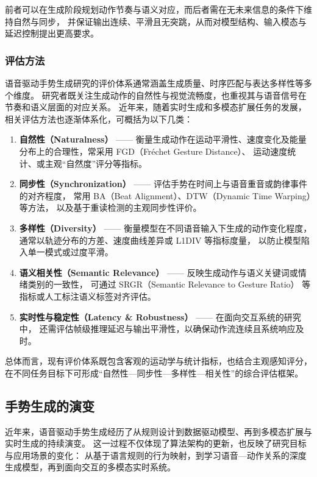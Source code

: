 前者可以在生成阶段规划动作节奏与语义对应，而后者需在无未来信息的条件下维持自然与同步，
并保证输出连续、平滑且无突跳，从而对模型结构、输入模态与延迟控制提出更高要求。

\subsubsection{评估方法}

语音驱动手势生成研究的评价体系通常涵盖生成质量、时序匹配与表达多样性等多个维度。
研究者既关注生成动作的自然性与视觉流畅度，也重视其与语音信号在节奏和语义层面的对应关系。
近年来，随着实时生成和多模态扩展任务的发展，相关评估方法也逐渐体系化，可概括为以下几类：

\begin{enumerate}
    \item \textbf{自然性（Naturalness）} —— 衡量生成动作在运动平滑性、速度变化及能量分布上的合理性，常采用 FGD（Fréchet Gesture Distance）\cite{ginosar2019speech2gesture}、
          运动速度统计、或主观“自然度”评分等指标。
    \item \textbf{同步性（Synchronization）} —— 评估手势在时间上与语音重音或韵律事件的对齐程度，
          常用 BA（Beat Alignment）\cite{kucherenko2021predictability}、DTW（Dynamic Time Warping）等方法，
          以及基于重读检测的主观同步性评价。
    \item \textbf{多样性（Diversity）} —— 衡量模型在不同语音输入下生成的动作变化程度，
          通常以轨迹分布的方差、速度曲线差异或 L1DIV 等指标度量，
          以防止模型陷入单一模式或过度平滑。
    \item \textbf{语义相关性（Semantic Relevance）} —— 反映生成动作与语义关键词或情绪类别的一致性，
          可通过 SRGR（Semantic Relevance to Gesture Ratio）\cite{beatcamn} 等指标或人工标注语义标签对齐评估。
    \item \textbf{实时性与稳定性（Latency \& Robustness）} —— 在面向交互系统的研究中，
          还需评估帧级推理延迟与输出平滑性，以确保动作流连续且系统响应及时。
\end{enumerate}

总体而言，现有评价体系既包含客观的运动学与统计指标，也结合主观感知评分，
在不同任务目标下可形成“自然性—同步性—多样性—相关性”的综合评估框架。

\subsection{手势生成的演变}

近年来，语音驱动手势生成经历了从规则设计到数据驱动模型、再到多模态扩展与实时生成的持续演变。
这一过程不仅体现了算法架构的更新，也反映了研究目标与应用场景的变化：
从基于语言规则的行为映射，到学习语音—动作关系的深度生成模型，再到面向交互的多模态实时系统。


